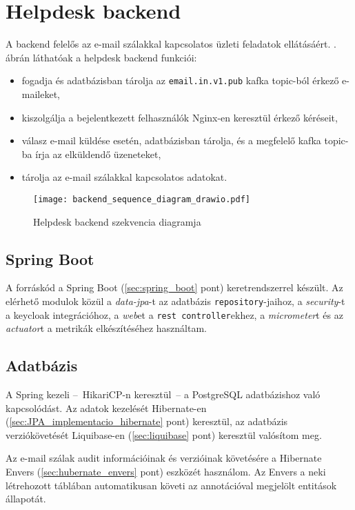 \section{Helpdesk backend}\label{sec:backend}
A backend felelős az e-mail szálakkal kapcsolatos üzleti feladatok ellátásáért. . ábrán láthatóak a helpdesk backend funkciói:
\begin{itemize}
	\item fogadja és adatbázisban tárolja az \texttt{email.in.v1.pub} kafka topic-ból érkező e-maileket, 
	\item kiszolgálja a bejelentkezett felhasználók Nginx-en keresztül érkező kéréseit,
	\item válasz e-mail küldése esetén, adatbázisban tárolja, és a megfelelő kafka topic-ba írja az elküldendő üzeneteket,
	\item tárolja az e-mail szálakkal kapcsolatos adatokat.
\end{itemize}


\begin{figure}[hbt] 
	\centering
	\texttt{[image: backend\_sequence\_diagram\_drawio.pdf]}
	\caption{Helpdesk backend szekvencia diagramja}
	\label{fig:backend_sequence_diagram}
\end{figure}


\subsection{Spring Boot}
A forráskód a Spring Boot (\ref{sec:spring_boot} pont) keretrendszerrel készült. Az elérhető modulok közül a \emph{data-jpa}-t az adatbázis \texttt{repository}-jaihoz, a \emph{security}-t a keycloak integrációhoz, a \emph{web}et a \texttt{rest controller}ekhez, a \emph{micrometer}t és az \emph{actuator}t a metrikák elkészítéséhez használtam.	


\subsection{Adatbázis}\label{sec:adatbazis}
A Spring kezeli --~HikariCP-n keresztül~--   a PostgreSQL adatbázishoz való kapcsolódást.
Az adatok kezelését Hibernate-en (\ref{sec:JPA_implementacio_hibernate} pont) keresztül, az adatbázis verziókövetését Liquibase-en (\ref{sec:liquibase} pont) keresztül valósítom meg. 

Az e-mail szálak audit információinak és verzióinak követésére a Hibernate Envers (\ref{sec:hubernate_envers} pont) eszközét használom. Az Envers a neki létrehozott táblában automatikusan követi az annotációval megjelölt entitások állapotát.


